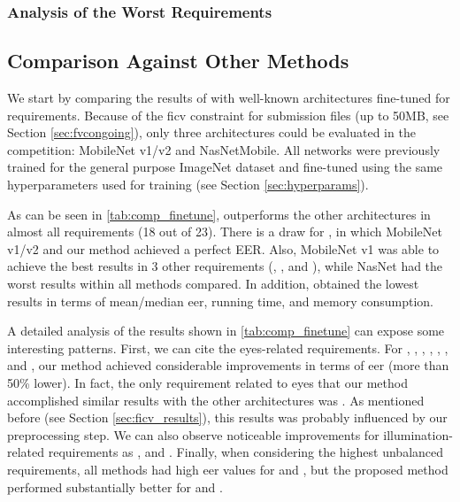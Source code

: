 

\subsubsection{Analysis of the Worst Requirements}


\subsection{Comparison Against Other Methods}

We start by comparing the results of \methodname with well-known architectures fine-tuned for \icao requirements. Because of the \acs{ficv} constraint for submission files (up to 50MB, see Section \ref{sec:fvcongoing}), only three architectures could be evaluated in the competition: MobileNet v1/v2 and NasNetMobile. All networks were previously trained for the general purpose ImageNet dataset \citep{imagenetdataset} and fine-tuned using the same hyperparameters used for \methodname training (see Section \ref{sec:hyperparams}).

As can be seen in \autoref{tab:comp_finetune}, \methodname outperforms the other architectures in almost all requirements (18 out of 23). There is a draw for \veiloverface, in which MobileNet v1/v2 and our method achieved a perfect EER. Also, MobileNet v1 was able to achieve the best results in 3 other requirements (\pixelation, \hatcap, and \otherfacesortoys), while NasNet had the worst results within all methods compared. In addition, \methodname obtained the lowest results in terms of mean/median \acs{eer}, running time, and memory consumption.

A detailed analysis of the results shown in \autoref{tab:comp_finetune} can expose some interesting patterns. First, we can cite the eyes-related requirements. For \lookingaway, \eyesclosed, \redeyes, \darktintedlenses, \flashlenses, \framestooheavy, and \framecoveringeyes, our method achieved considerable improvements in terms of \acs{eer} (more than 50\% lower). In fact, the only requirement related to eyes that our method accomplished similar results with the other architectures was \hairacrosseyes. As mentioned before (see Section \ref{sec:ficv_results}), this results was probably influenced by our preprocessing step. We can also observe noticeable improvements for illumination-related requirements as \toodarklight, \shadowsbehindhead and \shadowsacrossface. Finally, when considering the highest unbalanced requirements, all methods had high \acs{eer} values for \inkmarked and \otherfacesortoys, but the proposed method performed substantially better for \washedout and \framestooheavy.

